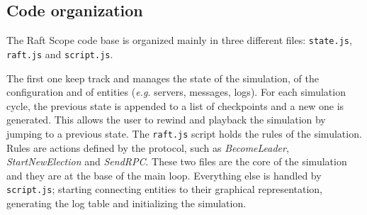 \subsection{Code organization}
The Raft Scope code base is organized mainly in three different files:
\texttt{state.js}, \texttt{raft.js} and \texttt{script.js}.

The first one keep track and manages the state of the simulation,
of the configuration and of entities (\emph{e.g.} servers, messages, logs).
For each simulation cycle, the previous state is appended to a list of checkpoints
and a new one is generated. This allows the user to rewind and playback
the simulation by jumping to a previous state.
The \texttt{raft.js} script holds the rules of the simulation.
Rules are actions defined by the protocol, such as \textit{BecomeLeader},
\textit{StartNewElection} and \textit{SendRPC}.
These two files are the core of the simulation and they are at the base of the main loop.
Everything else is handled by \texttt{script.js}; starting connecting entities
to their graphical representation, generating the log table and initializing the simulation.
